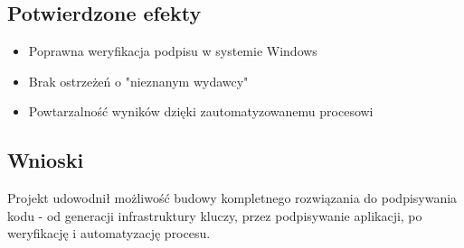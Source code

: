\documentclass{article}
\begin{document}
\subsection*{Potwierdzone efekty}
\begin{itemize}
    \item Poprawna weryfikacja podpisu w systemie Windows
    \item Brak ostrzeżeń o "nieznanym wydawcy"
    \item Powtarzalność wyników dzięki zautomatyzowanemu procesowi
\end{itemize}

\subsection*{Wnioski}
Projekt udowodnił możliwość budowy kompletnego rozwiązania do podpisywania kodu - od generacji infrastruktury kluczy, przez podpisywanie aplikacji, po weryfikację i automatyzację procesu.
\end{document}
